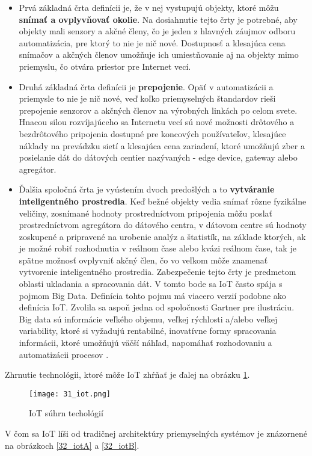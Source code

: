 \begin{itemize}
 \item Prvá základná črta definícii je, že v nej vystupujú objekty, ktoré môžu \textbf{snímať a ovplyvňovať okolie}. Na dosiahnutie tejto črty je potrebné, aby objekty mali senzory a akčné členy, čo je jeden z hlavných záujmov odboru automatizácia, pre ktorý to nie je nič nové.    Dostupnosť a klesajúca cena snímačov a akčných členov umožňuje ich umiestňovanie aj na objekty mimo priemyslu, čo otvára priestor pre Internet vecí. 
 \item Druhá základná črta definícii je \textbf{prepojenie}. Opäť v automatizácii a priemysle to nie je nič nové, veď koľko priemyselných štandardov rieši prepojenie senzorov a akčných členov na výrobných linkách po celom svete. Hnacou silou rozvíjajúceho sa Internetu vecí sú nové možnosti drôtového a bezdrôtového pripojenia dostupné pre koncových používateľov, klesajúce náklady na prevádzku sietí a klesajúca cena zariadení, ktoré umožňujú zber a posielanie dát do dátových centier nazývaných - edge device, gateway alebo agregátor.
 \item Ďalšia spoločná črta je vyústením dvoch predošlých a to \textbf{vytváranie inteligentného prostredia}. Keď bežné objekty vedia snímať rôzne fyzikálne veličiny, zosnímané hodnoty prostredníctvom pripojenia  môžu poslať prostredníctvom agregátora do dátového centra, v dátovom centre sú hodnoty zoskupené a pripravené na urobenie analýz a štatistík, na základe ktorých, ak je možné robiť rozhodnutia v reálnom čase alebo kvázi reálnom čase, tak je spätne možnosť ovplyvniť akčný člen, čo vo veľkom môže znamenať vytvorenie inteligentného prostredia. Zabezpečenie tejto črty je predmetom oblasti ukladania a spracovania dát. V tomto bode sa IoT často spája s pojmom Big Data. Definícia tohto pojmu má viacero verzií podobne ako definícia IoT. Zvolila sa aspoň jedna od spoločnosti Gartner pre ilustráciu. Big data sú informácie veľkého objemu, veľkej rýchlosti a/alebo veľkej variability, ktoré si vyžadujú rentabilné, inovatívne formy spracovania informácii, ktoré umožňujú väčší náhľad, napomáhať rozhodovaniu a automatizácii procesov \cite{IOT19}.
\end{itemize}
Zhrnutie technológii, ktoré môže IoT zhŕňať je ďalej na obrázku \ref{31_iot}.
\begin{figure}[h]
\centering
\texttt{[image: 31\_iot.png]}
\caption{IoT súhrn techológií \cite{IOT20}}
\label{31_iot}
\end{figure} 
V čom sa IoT líši od tradičnej architektúry priemyselných systémov je znázornené na obrázkoch \ref{32_iotA} a \ref{32_iotB}.


